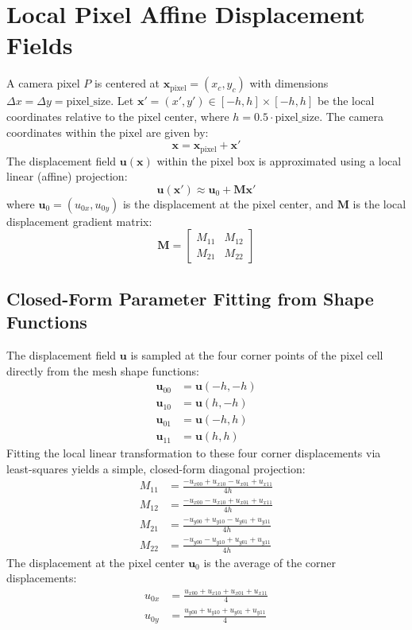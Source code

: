 \documentclass[11pt,a4paper]{article}
\begin{document}
\section{Local Pixel Affine Displacement Fields}
A camera pixel $P$ is centered at $\mathbf{x}_{\text{pixel}} = (x_c, y_c)$ with dimensions $\Delta x = \Delta y = \text{pixel\_size}$. Let $\mathbf{x}' = (x', y') \in [-h, h] \times [-h, h]$ be the local coordinates relative to the pixel center, where $h = 0.5 \cdot \text{pixel\_size}$. The camera coordinates within the pixel are given by:
\begin{equation}
\mathbf{x} = \mathbf{x}_{\text{pixel}} + \mathbf{x}'
\end{equation}
The displacement field $\mathbf{u}(\mathbf{x})$ within the pixel box is approximated using a local linear (affine) projection:
\begin{equation}
\mathbf{u}(\mathbf{x}') \approx \mathbf{u}_0 + \mathbf{M} \mathbf{x}'
\end{equation}
where $\mathbf{u}_0 = (u_{0x}, u_{0y})$ is the displacement at the pixel center, and $\mathbf{M}$ is the local displacement gradient matrix:
\begin{equation}
\mathbf{M} = \begin{bmatrix} M_{11} & M_{12} \\ M_{21} & M_{22} \end{bmatrix}
\end{equation}

\subsection{Closed-Form Parameter Fitting from Shape Functions}
The displacement field $\mathbf{u}$ is sampled at the four corner points of the pixel cell directly from the mesh shape functions:
\begin{align}
\mathbf{u}_{00} &= \mathbf{u}(-h, -h) \\
\mathbf{u}_{10} &= \mathbf{u}(h, -h) \\
\mathbf{u}_{01} &= \mathbf{u}(-h, h) \\
\mathbf{u}_{11} &= \mathbf{u}(h, h)
\end{align}
Fitting the local linear transformation to these four corner displacements via least-squares yields a simple, closed-form diagonal projection:
\begin{align}
M_{11} &= \frac{-u_{x00} + u_{x10} - u_{x01} + u_{x11}}{4h} \\
M_{12} &= \frac{-u_{x00} - u_{x10} + u_{x01} + u_{x11}}{4h} \\
M_{21} &= \frac{-u_{y00} + u_{y10} - u_{y01} + u_{y11}}{4h} \\
M_{22} &= \frac{-u_{y00} - u_{y10} + u_{y01} + u_{y11}}{4h}
\end{align}
The displacement at the pixel center $\mathbf{u}_0$ is the average of the corner displacements:
\begin{align}
u_{0x} &= \frac{u_{x00} + u_{x10} + u_{x01} + u_{x11}}{4} \\
u_{0y} &= \frac{u_{y00} + u_{y10} + u_{y01} + u_{y11}}{4}
\end{align}
\end{document}
